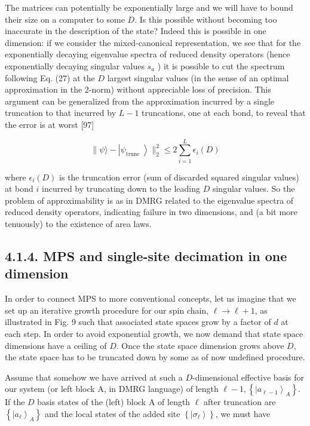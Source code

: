 \documentclass[12pt]{article}
\begin{document}
The matrices can potentially be exponentially large and we will have to bound their size on a computer to some $D$. Is this possible without becoming too inaccurate in the description of the state? Indeed this is possible in one dimension: if we consider the mixed-canonical representation, we see that for the exponentially decaying eigenvalue spectra of reduced density operators (hence exponentially decaying singular values $s_{a}$ ) it is possible to cut the spectrum following Eq. (27) at the $D$ largest singular values (in the sense of an optimal approximation in the 2-norm) without appreciable loss of precision. This argument can be generalized from the approximation incurred by a single truncation to that incurred by $L-1$ truncations, one at each bond, to reveal that the error is at worst [97]


\begin{equation*}
\| \psi\rangle-\left|\psi_{\text {trunc }}\right\rangle \|_{2}^{2} \leq 2 \sum_{i=1}^{L} \epsilon_{i}(D) \tag{58}
\end{equation*}


where $\epsilon_{i}(D)$ is the truncation error (sum of discarded squared singular values) at bond $i$ incurred by truncating down to the leading $D$ singular values. So the problem of approximability is as in DMRG related to the eigenvalue spectra of reduced density operators, indicating failure in two dimensions, and (a bit more tenuously) to the existence of area laws.

\subsection*{4.1.4. MPS and single-site decimation in one dimension}
In order to connect MPS to more conventional concepts, let us imagine that we set up an iterative growth procedure for our spin chain, $\ell \rightarrow \ell+1$, as illustrated in Fig. 9 such that associated state spaces grow by a factor of $d$ at each step. In order to avoid exponential growth, we now demand that state space dimensions have a ceiling of $D$. Once the state space dimension grows above $D$, the state space has to be truncated down by some as of now undefined procedure.

Assume that somehow we have arrived at such a $D$-dimensional effective basis for our system (or left block A, in DMRG language) of length $\ell-1,\left\{\left|a_{\ell-1}\right\rangle_{A}\right\}$. If the $D$ basis states of the (left) block A of length $\ell$ after truncation are $\left\{\left|a_{\ell}\right\rangle_{A}\right\}$ and the local states of the added site $\left\{\left|\sigma_{\ell}\right\rangle\right\}$, we must have
\end{document}
